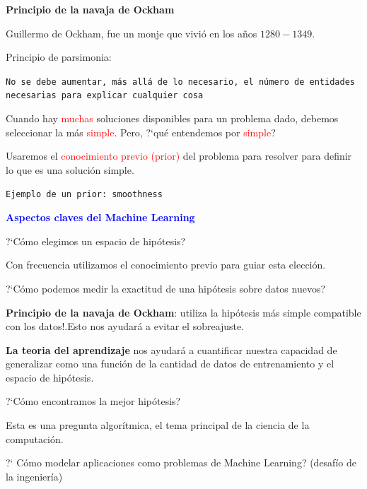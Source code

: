 \documentclass[11pt]{beamer}
\begin{document}
\begin{frame}{\textbf{\textcolor{green!55!blue}{Principio de la navaja de Ockham}}}

\begin{itemize}
\small{
\item  Guillermo de Ockham, fue un monje que vivi\'o en los a\~nos $1280-1349$.
\item Principio de parsimonia:}

\scriptsize{\texttt{No se debe aumentar, m\'as all\'a de lo necesario, el n\'umero de entidades necesarias para explicar cualquier cosa}}

\small{
\item Cuando hay \textcolor{red}{muchas} soluciones disponibles para un problema dado, debemos seleccionar la m\'as \textcolor{red}{simple}. Pero, ?`qu\'e entendemos por \textcolor{red}{simple}?

\item Usaremos el \textcolor{red}{conocimiento previo (prior)} del problema para resolver para definir lo que es
una soluci\'on simple.

\centering
\scriptsize{\texttt{Ejemplo de un prior: smoothness}}
}
\end{itemize}
\end{frame}

\begin{frame}{\textbf{\textcolor{blue}{Aspectos claves del Machine Learning}}}
	
\begin{itemize}
\small {
	\item  ?`C\'omo elegimos un espacio de hip\'otesis?}
	\begin{itemize}
	\scriptsize{
	\item Con frecuencia utilizamos el conocimiento previo para guiar esta elecci\'on.
}
	\end{itemize}
	\item \small {?`C\'omo podemos medir la exactitud de una hip\'otesis sobre datos nuevos?}
	\begin{itemize}
		\scriptsize{
		\item \textbf{Principio de la navaja de Ockham}: utiliza la hip\'otesis m\'as simple compatible con los datos!.Esto nos ayudar\'a a evitar el sobreajuste.
		\item \textbf{La teoria del aprendizaje} nos ayudar\'a a cuantificar nuestra capacidad de generalizar como una funci\'on de la cantidad de datos de entrenamiento y el espacio de hip\'otesis.
	}
	\end{itemize}
\small {\item ?`C\'omo encontramos la mejor hip\'otesis?}
	 \begin{itemize}
	\scriptsize{\item Esta es una pregunta algor\'itmica, el tema principal de la ciencia de la computaci\'on.}
\end{itemize}
\small {\item ?` C\'omo modelar aplicaciones como problemas de Machine Learning?
(desaf\'io de la  ingenier\'ia)
} 
\end{itemize}
	
\end{frame}
\end{document}
